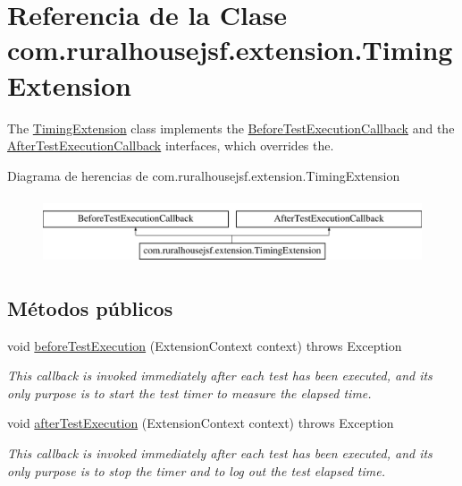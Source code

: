 \hypertarget{classcom_1_1ruralhousejsf_1_1extension_1_1_timing_extension}{}\section{Referencia de la Clase com.\+ruralhousejsf.\+extension.\+Timing\+Extension}
\label{classcom_1_1ruralhousejsf_1_1extension_1_1_timing_extension}


The \mbox{\hyperlink{classcom_1_1ruralhousejsf_1_1extension_1_1_timing_extension}{Timing\+Extension}} class implements the \mbox{\hyperlink{}{Before\+Test\+Execution\+Callback}} and the \mbox{\hyperlink{}{After\+Test\+Execution\+Callback}} interfaces, which overrides the.  


Diagrama de herencias de com.\+ruralhousejsf.\+extension.\+Timing\+Extension\begin{figure}[H]
\begin{center}
\leavevmode
\includegraphics[height=2.000000cm]{d0/dea/classcom_1_1ruralhousejsf_1_1extension_1_1_timing_extension}
\end{center}
\end{figure}
\subsection*{Métodos públicos}
\begin{DoxyCompactItemize}
\item 
void \mbox{\hyperlink{classcom_1_1ruralhousejsf_1_1extension_1_1_timing_extension_ad19d0a2513bd9041f9263c1d9536ed6c}{before\+Test\+Execution}} (Extension\+Context context)  throws Exception 
\begin{DoxyCompactList}\small\item\em This callback is invoked {\ttfamily immediately after} each test has been executed, and its only purpose is to start the test timer to measure the elapsed time. \end{DoxyCompactList}\item 
void \mbox{\hyperlink{classcom_1_1ruralhousejsf_1_1extension_1_1_timing_extension_a300725ce5f0290e9878185e05d84c019}{after\+Test\+Execution}} (Extension\+Context context)  throws Exception 
\begin{DoxyCompactList}\small\item\em This callback is invoked {\ttfamily immediately after} each test has been executed, and its only purpose is to stop the timer and to log out the test elapsed time. \end{DoxyCompactList}\end{DoxyCompactItemize}
